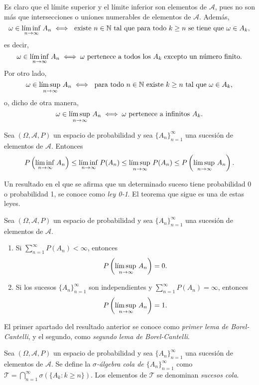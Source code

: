 \documentclass[a4paper, 11pt, extrafontsizes]{memoir}
\begin{document}
Es claro que el límite superior y el límite inferior son elementos de $\mathcal{A}$, pues no son más que intersecciones o uniones numerables de elementos de $\mathcal{A}$. Además,
\[\omega \in \linf_{n \to \infty} A_n \iff \textup{ existe } n \in \N \textup{ tal que para todo } k \geq n \textup{ se tiene que } \omega \in A_k,\]
es decir,
\[\omega \in \linf_{n \to \infty} A_n \iff \omega \textup{ pertenece a todos los } A_k \textup{ excepto un número finito}.\]
Por otro lado,
\[\omega \in \lsup_{n \to \infty} A_n \iff \textup{ para todo } n \in \N \textup{ existe } k \geq n \textup{ tal que } \omega \in A_k,\]
o, dicho de otra manera,
\[\omega \in \lsup_{n \to \infty} A_n \iff \omega \textup{ pertenece a infinitos } A_k.\]

\begin{proposition}
    Sea $(\Omega,\mathcal{A},P)$ un espacio de probabilidad y sea $\{A_n\}_{n=1}^\infty$ una sucesión de elementos de $\mathcal{A}$. Entonces
    \[P\left(\linf_{n \to \infty} A_n\right) \leq \linf_{n \to \infty} P(A_n) \leq \lsup_{n \to \infty} P(A_n) \leq P\left(\lsup_{n \to \infty} A_n\right).\]
\end{proposition}

Un resultado en el que se afirma que un determinado suceso tiene probabilidad 0 o probabilidad 1, se conoce como \emph{ley 0-1}. El teorema que sigue es una de estas leyes.

\begin{theorem}\label{teo:1.10.3}
    Sea $(\Omega,\mathcal{A},P)$ un espacio de probabilidad y sea $\{A_n\}_{n=1}^\infty$ una sucesión de elementos de $\mathcal{A}$.
    \begin{enumerate}
        \item Si $\sum_{n=1}^\infty P(A_n) < \infty$, entonces
        \[P\left(\lsup_{n \to \infty} A_n\right) = 0.\]
        \item Si los sucesos $\{A_n\}_{n=1}^\infty$ son independientes y $\sum_{n=1}^\infty P(A_n) =\infty$, entonces
        \[P\left(\lsup_{n \to \infty} A_n\right) = 1.\]
    \end{enumerate}
\end{theorem}

El primer apartado del resultado anterior se conoce como \emph{primer lema de Borel-Cantelli}, y el segundo, como \emph{segundo lema de Borel-Cantelli}.

\begin{definition}
    Sea $(\Omega,\mathcal{A},P)$ un espacio de probabilidad y sea $\{A_n\}_{n=1}^\infty$ una sucesión de elementos de $\mathcal{A}$. Se define la \emph{$\sigma$-álgebra cola de $\{A_n\}_{n=1}^\infty$} como $\mathcal{T} = \bigcap_{n=1}^\infty \sigma(\{A_k \colon k \geq n\})$. Los elementos de $\mathcal{T}$ se denominan \emph{sucesos cola}.
\end{definition}
\end{document}
